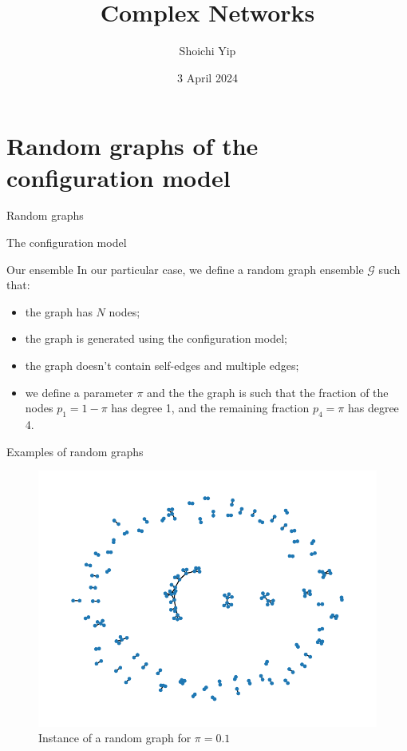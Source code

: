 \documentclass[handout]{beamer}
\title{Complex Networks}
\author{Shoichi Yip}
\institute{M2 PCS}
\date{3 April 2024}
\begin{document}
\frame{\titlepage}

\section{Random graphs of the configuration model}

\begin{frame}{Random graphs}
\end{frame}

\begin{frame}{The configuration model}
\end{frame}

\begin{frame}{Our ensemble}
    In our particular case, we define a random graph ensemble $\mathcal{G}$ such
    that:
    \begin{itemize}
        \item the graph has $N$ nodes;
        \item the graph is generated using the configuration model;
        \item the graph doesn't contain self-edges and multiple edges;
        \item we define a parameter $\pi$ and the the graph is such that the
            fraction of the nodes $p_1 = 1-\pi$ has degree 1, and the remaining
            fraction $p_4 = \pi$ has degree 4.
    \end{itemize}
\end{frame}

\begin{frame}{Examples of random graphs}
    \begin{figure}
        \centering
        \includegraphics[height=.7\textheight]{rg0}
        \caption{Instance of a random graph for $\pi=0.1$}
        \label{fig:rg0}
    \end{figure}
\end{frame}
\end{document}
